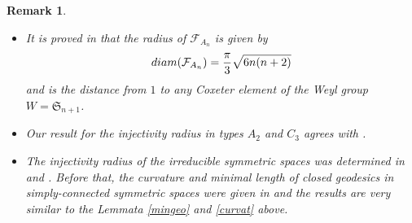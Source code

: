 \documentclass[11pt,twoside]{amsart}
\theoremstyle{plain}
\newtheorem{rem}[prop]{Remark}
\newcommand{\R}{{\mathbb R}}
\newcommand{\Sym}{\mathfrak{S}}
\begin{document}
\begin{rem}
\begin{itemize}
In types $B$ and $D$, we have $\mathfrak{k}=\mathfrak{so}_n(\R)$ and $\lambda^2=2\left\lfloor\frac{n-1}{2}\right\rfloor+\frac{(-1)^n-1}{2}=h^\vee$, so that we obtain the following improvement of the BW inequality:
\[\forall n\ge 5,~\sup_{X,Y\in\mathfrak{so}_n(\R)\setminus\{0\}}\frac{\|[X,Y]\|_F}{\|X\|_F\|Y\|_F}=1.\]
Moreover, as $\mathfrak{so}_3(\R)\simeq\mathfrak{su}(2)$, we have
\[\sup_{0\ne X,Y\in\mathfrak{so}_3(\R)}\frac{\|[X,Y]\|_F}{\|X\|_F\|Y\|_F}=\tfrac{1}{\sqrt{2}}.\]
Indeed, the map 
\[\left(\begin{smallmatrix}0 & x & z \\ -x & 0 & y \\ -z & -y & 0\end{smallmatrix}\right)\mapsto\tfrac12\left(\begin{smallmatrix}-iz & -ix-y \\ -ix+y & iz\end{smallmatrix}\right)\]
defines an isometry $(\mathfrak{so}_3(\R),\kappa)\stackrel{\tiny{\sim}}\to(\mathfrak{su}(2),\kappa)$ of Lie algebras and thus
\[\hspace{13.5mm}\sup_{0\ne X,Y\in\mathfrak{so}_3(\R)}\frac{\|[X,Y]\|_F}{\|X\|_F\|Y\|_F}=\sup_{0\ne X,Y\in\mathfrak{so}_3(\R)}\frac{\|[X,Y]\|_\kappa}{\|X\|_\kappa\|Y\|_\kappa}=\sup_{0\ne X,Y\in\mathfrak{su}(2)}\frac{\|[X,Y]\|_\kappa}{\|X\|_\kappa\|Y\|_\kappa}=\frac{1}{\sqrt{2}}.\]
These results were first derived in \cite[Theorem 6]{bloch-iserles}, with totally different methods. However, it should be noted that the authors also establish the displayed formula for $n=4$, which is unreachable by our method, as the Lie algebra $\mathfrak{so}_4(\R)\simeq\mathfrak{su}(2)\oplus\mathfrak{su}(2)$ is not simple.
\item It is proved in \cite[Theorem 2.11]{agrachev-chambrion} that the radius of $\mathcal{F}_{A_{n}}$ is given by
\[{\rm diam}(\mathcal{F}_{A_{n}})=\frac{\pi}{3}\sqrt{6n(n+2)}\]
and is the distance from $1$ to any Coxeter element of the Weyl group $W=\Sym_{n+1}$.
\item Our result for the injectivity radius in types $A_2$ and $C_3$ agrees with \cite[\S 3]{puttmann}.
\item The injectivity radius of the irreducible symmetric spaces was determined in \cite{yang1} and \cite{yang2}. Before that, the curvature and minimal length of closed geodesics in simply-connected symmetric spaces were given in \cite[Theorems 11.1 and 11.2]{helgason} and the results are very similar to the Lemmata \ref{mingeo} and \ref{curvat} above.


\end{itemize}
\end{rem}
\end{document}
